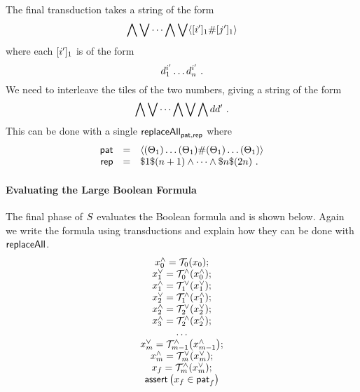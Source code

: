 The final transduction takes a string of the form
\[
    \bigwedge \bigvee \cdots \bigwedge \bigvee \lmark
        \tenc{1}{\idxi'} \spacer \tenc{1}{\idxj'}
    \rmark
\]
where each $\tenc{1}{\idxi'}$ is of the form
\[
    \vartile^{\idxi'}_1 \ldots \vartile^{\idxi'}_\linlen \ .
\]
We need to interleave the tiles of the two numbers, giving a string of the form
\[
    \bigwedge \bigvee \cdots \bigwedge \bigvee \bigwedge \vartile \vartile' \ .
\]
This can be done with a single $\replaceall_{\pat, \rep}$ where
\[
    \begin{array}{rcl}
        \pat &=&
            \langle
                (\tilesnum{1}) \ldots (\tilesnum{1})
            \spacer
                (\tilesnum{1}) \ldots (\tilesnum{1})
            \rangle \\
        \rep &=&
            \$1 \$(\linlen + 1)
            \land \cdots \land
            \$\linlen \$(2\linlen) \ . \\
    \end{array}
\]

\paragraph{Evaluating the Large Boolean Formula}

The final phase of $\scon$ evaluates the Boolean formula and is shown below.
Again we write the formula using transductions and explain how they can be done
with $\replaceall$.
\[
    \begin{array}{c}
        \svar^\land_0 = \ap{\psst_0}{\svar_0}; \\
        \svar^\lor_1 = \ap{\psst^\land_0}{\svar^\land_0}; \\
        \svar^\land_1 = \ap{\psst^\lor_1}{\svar^\lor_1}; \\
        \svar^\lor_2 = \ap{\psst^\land_1}{\svar^\land_1}; \\
        \svar^\land_2 = \ap{\psst^\lor_2}{\svar^\lor_2}; \\
        \svar^\land_3 = \ap{\psst^\land_2}{\svar^\land_2}; \\
        \ldots \\
        \svar^\lor_\expheight
            = \ap{\psst^\land_{\expheight-1}}{\svar^\land_{\expheight-1}}; \\
        \svar^\land_\expheight
            = \ap{\psst^\lor_\expheight}{\svar^\lor_{\expheight}}; \\
        \svar_f
            = \ap{\psst^\land_\expheight}{\svar^\lor_{\expheight}}; \\
        \ASSERT{\svar_f \in \pat_f}
    \end{array}
\]

